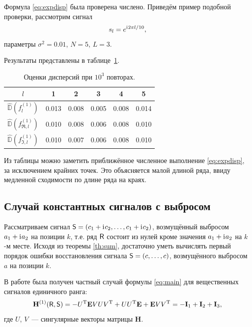 \documentclass[specialist,
               substylefile = spbu.rtx,
               subf,href,colorlinks=true, 12pt]{disser}
\begin{document}
Формула \eqref{eq:expdisp} была проверена числено. Приведём пример подобной проверки, рассмотрим сигнал
$$s_l = e^{\mathrm{i}\mkern1mu 2 \pi l / 10},$$
параметры $\sigma^2 = 0.01$, $N = 5$, $L = 3$.

Результаты представлены в таблице~\ref{tab:pi_div_2}.

\begin{table}[H]
	\begin{center}
		\caption{Оценки дисперсий при $10^3$ повторах.}
		\label{tab:pi_div_2}
		\begin{tabular}{|c|c|c|c|c|c|}
			\hline
			$l$	& 1 & 2 & 3 & 4 & 5\\
			\hline
			$\hat{\mathbb{D}}(f^{(1)}_l)$ & 0.013  & 0.008  & 0.005 & 0.008 & 0.014\\
			\hline
			$\hat{\mathbb{D}}(f^{(1)}_{\Re, l})$ & 0.010 & 0.008 & 0.006 & 0.008 & 0.010\\
			\hline
			$\hat{\mathbb{D}}(f^{(1)}_{\Im, l})$ & 0.010  & 0.007  & 0.006 & 0.008 & 0.010\\
			\hline
		\end{tabular}
	\end{center}
\end{table}

Из таблицы можно заметить приближённое численное выполнение \eqref{eq:expdisp}, за исключением крайних точек. Это объясняется малой длиной ряда, ввиду медленной сходимости по длине ряда на краях.

\subsection{Случай константных сигналов с выбросом}
Рассматриваем сигнал $\textsf{S} = (c_1 + \mathrm{i}\mkern1mu c_2, \ldots, c_1 + \mathrm{i}\mkern1mu c_2)$, возмущённый выбросом $a_1 + \mathrm{i}\mkern1mu a_2$ на позиции $k$, т.е. ряд $\textsf{R}$ состоит из нулей кроме значения $a_1 + \mathrm{i}\mkern1mu a_2$ на $k$-м месте. Исходя из теоремы \ref{th:sum}, достаточно уметь вычислять первый порядок ошибки восстановления сигнала $\textsf{S} = (c, \ldots, c)$, возмущённого выбросом $a$ на позиции $k$.

В работе \cite{Nekr2008} была получен частный случай формулы \eqref{eq:main} для вещественных сигналов единичного ранга:
\begin{equation} \label{eq:real_rk1}
\mathbf{H}^{(1)}(\textsf{R}, \textsf{S}) = -U^{\mathrm{T}} \mathbf{E} V U V^{\mathrm{T}} + U U^{\mathrm{T}} \mathbf{E} + \mathbf{E} V V^{\mathrm{T}} = -\mathbf{I}_1 + \mathbf{I}_2 + \mathbf{I}_3,
\end{equation}
где $U$, $V$~--- сингулярные векторы матрицы $\mathbf{H}$.
\end{document}
